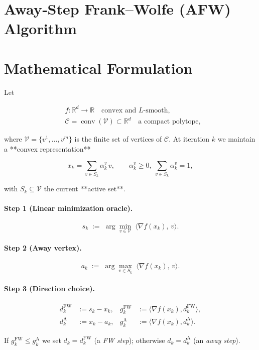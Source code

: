 \documentclass{article}
\begin{document}
\section*{Away‑Step Frank–Wolfe (AFW) Algorithm}

\section*{Mathematical Formulation}
Let  

\[
\begin{aligned}
&f:\mathbb{R}^{d}\rightarrow\mathbb{R}\quad\text{convex and }L\text{-smooth},\\
&\mathcal{C}= \operatorname{conv}(\mathcal{V})\subset\mathbb{R}^{d}\quad\text{a compact polytope},
\end{aligned}
\]

where $\mathcal{V}=\{v^{1},\dots ,v^{m}\}$ is the finite set of vertices of $\mathcal{C}$.
At iteration $k$ we maintain a **convex representation**

\[
x_{k}= \sum_{v\in S_{k}} \alpha_{k}^{v}\,v ,\qquad 
\alpha_{k}^{v}\ge 0,\ \sum_{v\in S_{k}}\alpha_{k}^{v}=1,
\]

with $S_{k}\subseteq\mathcal{V}$ the current **active set**.  

\paragraph{Step 1 (Linear minimization oracle).}
\[
s_{k}\;:=\;\arg\min_{v\in\mathcal{V}}\;\langle \nabla f(x_{k}),\,v\rangle .
\]

\paragraph{Step 2 (Away vertex).}
\[
a_{k}\;:=\;\arg\max_{v\in S_{k}}\;\langle \nabla f(x_{k}),\,v\rangle .
\]

\paragraph{Step 3 (Direction choice).}
\[
\begin{aligned}
d^{\mathrm{FW}}_{k}&:= s_{k}-x_{k}, &
g^{\mathrm{FW}}_{k}&:=\langle \nabla f(x_{k}),d^{\mathrm{FW}}_{k}\rangle ,\\
d^{\mathrm{A}}_{k}&:= x_{k}-a_{k}, &
g^{\mathrm{A}}_{k}&:=\langle \nabla f(x_{k}),d^{\mathrm{A}}_{k}\rangle .
\end{aligned}
\]

If $g^{\mathrm{FW}}_{k}\le g^{\mathrm{A}}_{k}$ we set $d_{k}=d^{\mathrm{FW}}_{k}$ (a \emph{FW step}); otherwise $d_{k}=d^{\mathrm{A}}_{k}$ (an \emph{away step}).
\end{document}
